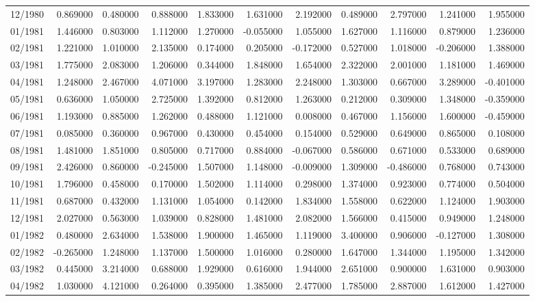 \begin{tabular}{lrrrrrrrrrr}
12/1980 & 0.869000 & 0.480000 & 0.888000 & 1.833000 & 1.631000 & 2.192000 & 0.489000 & 2.797000 & 1.241000 & 1.955000 \\
01/1981 & 1.446000 & 0.803000 & 1.112000 & 1.270000 & -0.055000 & 1.055000 & 1.627000 & 1.116000 & 0.879000 & 1.236000 \\
02/1981 & 1.221000 & 1.010000 & 2.135000 & 0.174000 & 0.205000 & -0.172000 & 0.527000 & 1.018000 & -0.206000 & 1.388000 \\
03/1981 & 1.775000 & 2.083000 & 1.206000 & 0.344000 & 1.848000 & 1.654000 & 2.322000 & 2.001000 & 1.181000 & 1.469000 \\
04/1981 & 1.248000 & 2.467000 & 4.071000 & 3.197000 & 1.283000 & 2.248000 & 1.303000 & 0.667000 & 3.289000 & -0.401000 \\
05/1981 & 0.636000 & 1.050000 & 2.725000 & 1.392000 & 0.812000 & 1.263000 & 0.212000 & 0.309000 & 1.348000 & -0.359000 \\
06/1981 & 1.193000 & 0.885000 & 1.262000 & 0.488000 & 1.121000 & 0.008000 & 0.467000 & 1.156000 & 1.600000 & -0.459000 \\
07/1981 & 0.085000 & 0.360000 & 0.967000 & 0.430000 & 0.454000 & 0.154000 & 0.529000 & 0.649000 & 0.865000 & 0.108000 \\
08/1981 & 1.481000 & 1.851000 & 0.805000 & 0.717000 & 0.884000 & -0.067000 & 0.586000 & 0.671000 & 0.533000 & 0.689000 \\
09/1981 & 2.426000 & 0.860000 & -0.245000 & 1.507000 & 1.148000 & -0.009000 & 1.309000 & -0.486000 & 0.768000 & 0.743000 \\
10/1981 & 1.796000 & 0.458000 & 0.170000 & 1.502000 & 1.114000 & 0.298000 & 1.374000 & 0.923000 & 0.774000 & 0.504000 \\
11/1981 & 0.687000 & 0.432000 & 1.131000 & 1.054000 & 0.142000 & 1.834000 & 1.558000 & 0.622000 & 1.124000 & 1.903000 \\
12/1981 & 2.027000 & 0.563000 & 1.039000 & 0.828000 & 1.481000 & 2.082000 & 1.566000 & 0.415000 & 0.949000 & 1.248000 \\
01/1982 & 0.480000 & 2.634000 & 1.538000 & 1.900000 & 1.465000 & 1.119000 & 3.400000 & 0.906000 & -0.127000 & 1.308000 \\
02/1982 & -0.265000 & 1.248000 & 1.137000 & 1.500000 & 1.016000 & 0.280000 & 1.647000 & 1.344000 & 1.195000 & 1.342000 \\
03/1982 & 0.445000 & 3.214000 & 0.688000 & 1.929000 & 0.616000 & 1.944000 & 2.651000 & 0.900000 & 1.631000 & 0.903000 \\
04/1982 & 1.030000 & 4.121000 & 0.264000 & 0.395000 & 1.385000 & 2.477000 & 1.785000 & 2.887000 & 1.612000 & 1.427000 \\

\end{tabular}
